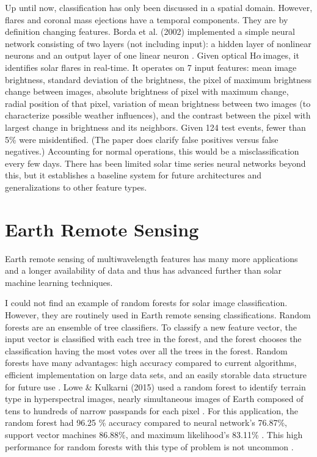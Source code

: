 \documentclass[twoside]{report}
\newcommand{\halpha}{H$\alpha$\,}
\begin{document}
Up until now, classification has only been discussed in a spatial domain. However, flares and coronal mass ejections have a temporal components. They are by definition changing features. Borda et al. (2002) implemented a simple neural network consisting of two layers (not including input): a hidden layer of nonlinear neurons and
an output layer of one linear neuron \cite{borda2002automatic}. Given optical \halpha images, it identifies solar flares in real-time. It operates on 7 input features: mean image brightness, standard deviation of the brightness, the pixel of maximum brightness change between images, absolute brightness of pixel with maximum change, radial position of that pixel, variation of mean brightness between two images (to characterize possible weather influences), and the contrast between the pixel with largest change in brightness and its neighbors. Given 124 test events, fewer than 5\% were misidentified. (The paper does clarify false positives versus false negatives.) Accounting for normal operations, this would be a misclassification every few days. There has been limited solar time series neural networks beyond this, but it establishes a baseline system for future architectures and generalizations to other feature types.

\section{Earth Remote Sensing}
Earth remote sensing of multiwavelength features has many more applications and a longer availability of data and thus has advanced further than solar machine learning techniques. 

I could not find an example of random forests for solar image classification. However, they are routinely used in Earth remote sensing classifications. Random forests are an ensemble of tree classifiers. To classify a new feature vector, the input vector is classified with each tree in the forest, and the forest chooses the classification having the most votes over all the trees in the forest. Random forests have many advantages: high accuracy compared to current algorithms, efficient implementation on large data
sets, and an easily storable data structure for future use \cite{ghose2010decision}. Lowe \& Kulkarni (2015) used a random forest to identify terrain type in hyperspectral images, nearly simultaneous images of Earth composed of tens to hundreds of narrow passpands for each pixel \cite{lowe:2015}. For this application, the random forest had 96.25 \% accuracy compared to neural network's 76.87\%, support vector machines 86.88\%, and maximum likelihood's 83.11\% \cite{lowe:2015}. This high performance for random forests with this type of problem is not uncommon \cite{puissant2014object, salas2016multispectral, clark2016mapping, kulkarni2017multispectral}.
\end{document}
